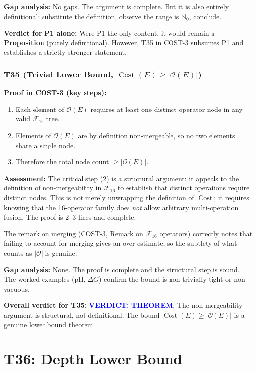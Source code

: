 \documentclass[12pt,a4paper]{article}
\theoremstyle{definition}
\newcommand{\Cost}{\operatorname{Cost}}
\newcommand{\Fam}{\mathcal{F}}
\newcommand{\verdictTHEOREM}{\textbf{\textcolor{blue}{VERDICT: THEOREM}}}
\begin{document}
\textbf{Gap analysis:}  No gaps.  The argument is complete.  But it is
also entirely definitional: substitute the definition, observe the range
is $\mathbb{N}_0$, conclude.

\textbf{Verdict for P1 alone:}
Were P1 the only content, it would remain a \textbf{Proposition} (purely
definitional).  However, T35 in COST-3 subsumes P1 and establishes a
strictly stronger statement.

\subsubsection{T35 (Trivial Lower Bound, $\Cost(E) \geq |\mathcal{O}(E)|$)}

\textbf{Proof in COST-3 (key steps):}
\begin{enumerate}
  \item Each element of $\mathcal{O}(E)$ requires at least one distinct
        operator node in any valid $\Fam_{16}$ tree.
  \item Elements of $\mathcal{O}(E)$ are by definition non-mergeable, so no
        two elements share a single node.
  \item Therefore the total node count $\geq |\mathcal{O}(E)|$.
\end{enumerate}

\textbf{Assessment:}  The critical step (2) is a structural argument: it
appeals to the definition of non-mergeability in $\Fam_{16}$ to establish
that distinct operations require distinct nodes.  This is not merely
unwrapping the definition of $\Cost$; it requires knowing that the 16-operator
family does \emph{not} allow arbitrary multi-operation fusion.  The proof is
2--3 lines and complete.

The remark on merging (COST-3, Remark on $\Fam_{16}$ operators) correctly
notes that failing to account for merging gives an over-estimate, so the
subtlety of what counts as $|\mathcal{O}|$ is genuine.

\textbf{Gap analysis:}  None.  The proof is complete and the structural step
is sound.  The worked examples (pH, $\Delta G$) confirm the bound is
non-trivially tight or non-vacuous.

\textbf{Overall verdict for T35:}  \verdictTHEOREM.
The non-mergeability argument is structural, not definitional.  The bound
$\Cost(E) \geq |\mathcal{O}(E)|$ is a genuine lower bound theorem.

\section{T36: Depth Lower Bound}
\end{document}

